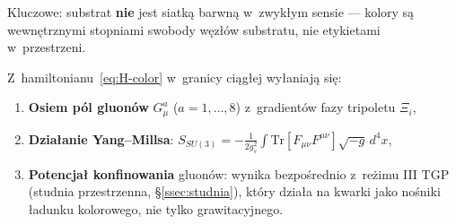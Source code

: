Kluczowe: substrat \textbf{nie} jest siatką barwną w~zwykłym
sensie --- kolory są wewnętrznymi stopniami swobody węzłów substratu,
nie etykietami w~przestrzeni.

\begin{theorem}\label{thm:gluon-emergence}
Z~hamiltonianu~\eqref{eq:H-color} w~granicy ciągłej wyłaniają się:
\begin{enumerate}[nosep]
    \item \textbf{Osiem pól gluonów} $G_\mu^a$ ($a = 1,\ldots,8$)
          z~gradientów fazy tripoletu $\Xi_i$,
    \item \textbf{Działanie Yang--Millsa}:
          $S_{SU(3)} = -\frac{1}{2g_s^2}\int
          \mathrm{Tr}[F_{\mu\nu}F^{\mu\nu}]\sqrt{-g}\,d^4x$,
    \item \textbf{Potencjał konfinowania} gluonów: wynika
          bezpośrednio z~re\.zimu III TGP (studnia przestrzenna,
          \S\ref{ssec:studnia}), który działa na kwarki jako
          nośniki ładunku kolorowego, nie tylko grawitacyjnego.
\end{enumerate}
\end{theorem}

